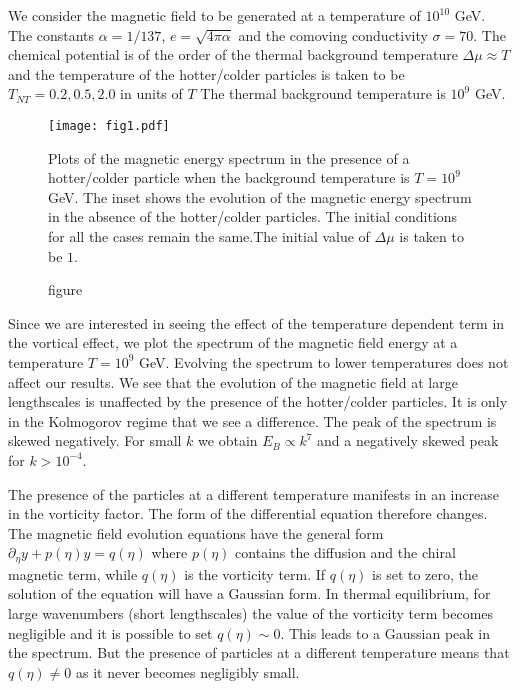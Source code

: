 \documentclass{ws-mpla}
\begin{document}
We consider the magnetic field to be generated at a temperature of $ 10^{10}$ GeV. The constants $\alpha = 1/137$, $e = \sqrt{4 \pi \alpha}$ and the comoving 
conductivity $\sigma = 70$. The chemical potential is of the order of the thermal background temperature $\Delta \mu \approx T$ and the temperature of the 
hotter/colder particles is taken to be $T_{NT} = 0.2, 0.5 , 2.0 $ in units of $T$ The thermal background temperature is $10^{9}$ GeV.  
\begin{figure}
\begin{center}
	\texttt{[image: fig1.pdf]}
	\caption{figure}{Plots of the magnetic energy spectrum in the presence of a hotter/colder particle when the background temperature is $T = 10^9 $ GeV. 
	The inset shows the evolution of the magnetic energy spectrum in the absence of the hotter/colder particles. The initial conditions for all the cases 
	remain the same.The initial value of $\Delta\mu$ is taken to be $1$.} 
\end{center}	
\end{figure}

Since we are interested in seeing the effect of the temperature dependent term in the vortical effect, we plot the spectrum of the magnetic field energy at a 
temperature $T = 10^{9}$ GeV. Evolving the spectrum to lower temperatures does not affect our results. We see that the evolution of the magnetic field at large 
lengthscales is unaffected by the presence of the hotter/colder particles. It is only in the Kolmogorov regime that 
we see a difference. The peak of the spectrum is skewed negatively. For small $k$ we obtain $E_B \propto k^7$ and a negatively skewed peak for $k > 10^{-4}$.


The presence of the particles at a different temperature
manifests in an increase in the vorticity factor. The form of the differential equation therefore changes. The magnetic field evolution equations have the general
form $\partial_\eta y + p(\eta) y = q(\eta)$ where $p(\eta)$ contains the diffusion and the chiral magnetic term, while $q(\eta)$ is the vorticity term. If $q(\eta)$ is set 
to zero, the solution of the equation will have a Gaussian form. In thermal equilibrium, for large wavenumbers (short lengthscales) the value of the vorticity 
term becomes negligible and it is possible to set  $q(\eta) \sim 0$. This leads to a Gaussian peak in the spectrum. But the presence of particles at a different temperature 
means that $q(\eta) \neq 0$ as it never becomes negligibly small. 
\end{document}
